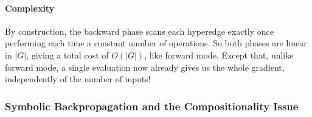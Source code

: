 \paragraph{Complexity}
By construction, the backward phase scans each hyperedge exactly once performing each time a constant number
of operations. So both phases are linear in $|G|$, giving a total cost of $O(|G|)$, like forward mode. Except that, unlike
forward mode, a single evaluation now already gives us the whole gradient, independently of the number of inputs!

\subsubsection{Symbolic Backpropagation and the Compositionality Issue}